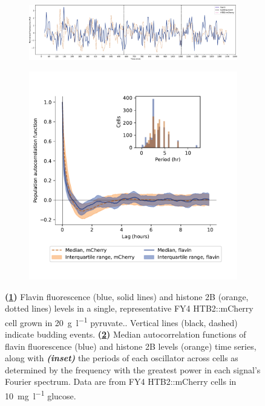 \begin{figure}
  \centering
  \begin{subfigure}[htpb]{1.0\textwidth}
   \centering
   \includegraphics[width=\textwidth]{limiting_single_birth_plot_edit.pdf}
   \caption{
   }
   \label{fig:biology-lowglc-single}
  \end{subfigure}

  \begin{subfigure}[htpb]{0.7\textwidth}
   \centering
   \includegraphics[width=\textwidth]{htb2mCherry_31492_12.pdf}
   \caption{
   }
   \label{fig:biology-lowglc-acf}
  \end{subfigure}
  \caption{
    \textbf{(\ref{fig:biology-lowglc-single})}
    Flavin fluorescence (blue, solid lines) and histone 2B (orange, dotted lines) levels in a single, representative FY4 HTB2::mCherry cell grown in \SI{20}{\gram~\litre^{-1}} pyruvate..
    Vertical lines (black, dashed) indicate budding events.
    \textbf{(\ref{fig:biology-lowglc-acf})}
    Median autocorrelation functions of flavin fluorescence (blue) and histone 2B levels (orange) time series, along with \textit{\textbf{(inset)}} the periods of each oscillator across cells as determined by the frequency with the greatest power in each signal's Fourier spectrum.
    Data are from FY4 HTB2::mCherry cells in \SI{10}{\milli\gram~\litre^{-1}} glucose.
  }
  \label{fig:biology-lowglc}
\end{figure}


